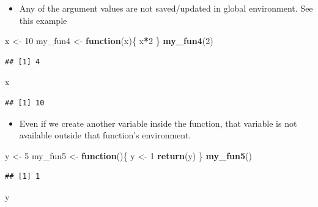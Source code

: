 \documentclass[
]{book}
\newenvironment{Shaded}{\begin{snugshade}}{\end{snugshade}}
\newcommand{\ControlFlowTok}[1]{\textcolor[rgb]{0.13,0.29,0.53}{\textbf{#1}}}
\newcommand{\DecValTok}[1]{\textcolor[rgb]{0.00,0.00,0.81}{#1}}
\newcommand{\FunctionTok}[1]{\textcolor[rgb]{0.13,0.29,0.53}{\textbf{#1}}}
\newcommand{\NormalTok}[1]{#1}
\newcommand{\OtherTok}[1]{\textcolor[rgb]{0.56,0.35,0.01}{#1}}
\newcommand{\SpecialCharTok}[1]{\textcolor[rgb]{0.81,0.36,0.00}{\textbf{#1}}}
\providecommand{\tightlist}{%
  \setlength{\itemsep}{0pt}\setlength{\parskip}{0pt}}
\begin{document}
\begin{itemize}
\tightlist
\item
  Any of the argument values are not saved/updated in global environment. See this example
\end{itemize}

\begin{Shaded}
\begin{Highlighting}[]
\NormalTok{x }\OtherTok{\textless{}{-}} \DecValTok{10}
\NormalTok{my\_fun4 }\OtherTok{\textless{}{-}} \ControlFlowTok{function}\NormalTok{(x)\{}
\NormalTok{  x}\SpecialCharTok{*}\DecValTok{2}
\NormalTok{\}}
\FunctionTok{my\_fun4}\NormalTok{(}\DecValTok{2}\NormalTok{)}
\end{Highlighting}
\end{Shaded}

\begin{verbatim}
## [1] 4
\end{verbatim}

\begin{Shaded}
\begin{Highlighting}[]
\NormalTok{x}
\end{Highlighting}
\end{Shaded}

\begin{verbatim}
## [1] 10
\end{verbatim}

\begin{itemize}
\tightlist
\item
  Even if we create another variable inside the function, that variable is not available outside that function's environment.
\end{itemize}

\begin{Shaded}
\begin{Highlighting}[]
\NormalTok{y }\OtherTok{\textless{}{-}} \DecValTok{5}
\NormalTok{my\_fun5 }\OtherTok{\textless{}{-}} \ControlFlowTok{function}\NormalTok{()\{}
\NormalTok{  y }\OtherTok{\textless{}{-}} \DecValTok{1}
  \FunctionTok{return}\NormalTok{(y)}
\NormalTok{\}}
\FunctionTok{my\_fun5}\NormalTok{()}
\end{Highlighting}
\end{Shaded}

\begin{verbatim}
## [1] 1
\end{verbatim}

\begin{Shaded}
\begin{Highlighting}[]
\NormalTok{y}
\end{Highlighting}
\end{Shaded}
\end{document}
